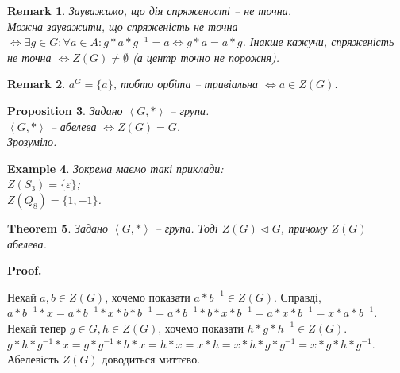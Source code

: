 \documentclass[a4paper, 10pt]{article}
\makeatletter
\theoremstyle{theoremdd}
\newtheorem{theorem}{Theorem}[subsection]
\theoremstyle{theoremdd}
\theoremstyle{theoremdd}
\theoremstyle{theoremdd}
\theoremstyle{theoremdd}
\newtheorem{example}[theorem]{Example}
\theoremstyle{theoremdd}
\theoremstyle{theoremdd}
\theoremstyle{theoremdd}
\theoremstyle{theoremdd}
\newtheorem{proposition}[theorem]{Proposition}
\theoremstyle{theoremdd}
\theoremstyle{theoremdd}
\newtheorem{remark}[theorem]{Remark}
\theoremstyle{theoremdd}
\theoremstyle{theoremdd}
\theoremstyle{theoremdd}
\theoremstyle{theoremdd}
\renewenvironment{proof}[1][Proof.\\]{\par
\pushQED{\hfill \qed}%
\normalfont \topsep6\p@\@plus6\p@\relax
\trivlist
\item\relax
{\bfseries
#1\@addpunct{.}}\hspace\labelsep\ignorespaces
}{%
\popQED\endtrivlist\@endpefalse
}
\makeatother
\begin{document}
\begin{remark}
Зауважимо, що дія спряженості -- не точна.\\
Можна зауважити, що спряженість не точна $\iff \exists g \in G: \forall a \in A: g*a*g^{-1} = a \iff g*a = a*g$. Інакше кажучи, спряженість не точна $\iff Z(G) \neq \emptyset$ (а центр точно не порожня).
\end{remark}

\begin{remark}
$a^G = \{a\}$, тобто орбіта -- тривіальна $\iff a \in Z(G)$.
\end{remark}

\begin{proposition}
Задано $\left< G,*\right>$ -- група.\\
$\left< G,*\right>$ -- абелева $\iff Z(G) = G$.\\
\textit{Зрозуміло.}
\end{proposition}

\iffalse
\begin{proposition}
Задано $\left< G,*\right>$ - група.\\
$a \in G$ - центральний елемент $\iff \text{card}(C_G(a)) = 1$.
\end{proposition}

\begin{proof}
$a \in Z(G) \iff a*g = g*a, \forall g \in G \iff g^{-1}*a*g=a, \forall g \in G \iff C_G(a) = \{a\} \iff \text{card}(C_G(a)) = 1$.
\end{proof}
\fi

\begin{example}
Зокрема маємо такі приклади:\\
$Z(S_3) = \{\varepsilon\}$;\\
$Z(Q_8) = \{1,-1\}$.
\end{example}

\begin{theorem}
Задано $\left< G,*\right>$ -- група. Тоді $Z(G) \triangleleft G$, причому $Z(G)$ абелева.
\end{theorem}

\begin{proof}
Нехай $a,b \in Z(G)$, хочемо показати $a*b^{-1} \in Z(G)$. Справді,\\
$a*b^{-1}*x = a*b^{-1}*x*b*b^{-1} = a*b^{-1}*b*x*b^{-1}= a*x*b^{-1} = x*a*b^{-1}$.\\
Нехай тепер $g \in G, h \in Z(G)$, хочемо показати $h*g*h^{-1} \in Z(G)$.\\ $g*h*g^{-1}*x = g*g^{-1}*h*x = h*x = x*h = x*h*g*g^{-1} = x*g*h*g^{-1}$.\\
Абелевість $Z(G)$ доводиться миттєво.
\end{proof}
\end{document}
